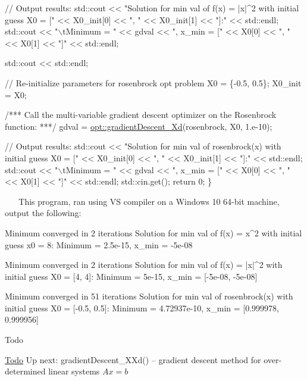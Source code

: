 \begin{DoxyCodeInclude}
    \textcolor{comment}{// Output results:}
    std::cout << \textcolor{stringliteral}{"Solution for min val of f(x) = |x|^2 with initial guess X0 = ["} << X0\_init[0] << \textcolor{stringliteral}{", "} << 
      X0\_init[1] << \textcolor{stringliteral}{"]:"} << std::endl;
    std::cout << \textcolor{stringliteral}{"\(\backslash\)tMinimum = "} << gdval << \textcolor{stringliteral}{", x\_min = ["} << X0[0] << \textcolor{stringliteral}{", "} << X0[1] << \textcolor{stringliteral}{"]"} << std::endl;

    std::cout << std::endl;

    \textcolor{comment}{// Re-initialize parameters for rosenbrock opt problem}
    X0 = \{-0.5, 0.5\};
    X0\_init = X0;

    \textcolor{comment}{/*** Call the multi-variable gradient descent optimizer on the Rosenbrock function: ***/}
    gdval = \mbox{\hyperlink{namespaceopt_a7db27c86e1c5a503b7f8373ba067d97b}{opt::gradientDescent\_Xd}}(rosenbrock, X0, 1.e-10);

    \textcolor{comment}{// Output results:}
    std::cout << \textcolor{stringliteral}{"Solution for min val of rosenbrock(x) with initial guess X0 = ["} << X0\_init[0] << \textcolor{stringliteral}{", "} <<
       X0\_init[1] << \textcolor{stringliteral}{"]:"} << std::endl;
    std::cout << \textcolor{stringliteral}{"\(\backslash\)tMinimum = "} << gdval << \textcolor{stringliteral}{", x\_min = ["} << X0[0] << \textcolor{stringliteral}{", "} << X0[1] << \textcolor{stringliteral}{"]"} << std::endl;
    std::cin.get();
    \textcolor{keywordflow}{return} 0;
\}
\end{DoxyCodeInclude}
 ~\newline
~\newline
 This program, ran using VS compiler on a Windows 10 64-\/bit machine, output the following\+: ~\newline
 
\begin{DoxyCode}
Minimum converged in 2 iterations
Solution for min val of f(x) = x^2 with initial guess x0 = 8:
        Minimum = 2.5e-15, x\_min = -5e-08

Minimum converged in 2 iterations
Solution for min val of f(x) = |x|^2 with initial guess X0 = [4, 4]:
        Minimum = 5e-15, x\_min = [-5e-08, -5e-08]

Minimum converged in 51 iterations
Solution for min val of rosenbrock(x) with initial guess X0 = [-0.5, 0.5]:
        Minimum = 4.72937e-10, x\_min = [0.999978, 0.999956]
\end{DoxyCode}
 \begin{DoxyRefDesc}{Todo}
\item[\mbox{\hyperlink{todo__todo000001}{Todo}}]Up next\+: gradient\+Descent\+\_\+\+X\+Xd() -- gradient descent method for over-\/determined linear systems $Ax=b$ \end{DoxyRefDesc}


